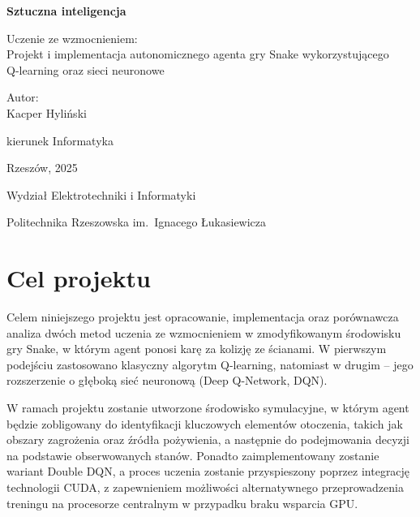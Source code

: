 \documentclass[a4paper,12pt]{article}
\begin{document}
\begin{titlepage}
  \thispagestyle{empty}
  \begin{center}
    {\LARGE\bfseries Sztuczna inteligencja\par}
    \vspace{1.5cm}

    {\large Uczenie ze wzmocnieniem:\\
    Projekt i implementacja autonomicznego agenta gry Snake wykorzystującego\\
    Q-learning oraz sieci neuronowe\par}
    \vspace{3cm}

    {\Large Autor:\\
    Kacper Hyliński\par}
    {\large kierunek Informatyka\par}
    \vfill

    {\large Rzeszów, 2025\par}
    \vspace{0.4cm}
    {\normalsize Wydział Elektrotechniki i Informatyki\par}
    {\normalsize Politechnika Rzeszowska im.\ Ignacego Łukasiewicza\par}
  \end{center}
\end{titlepage}
 
 \clearpage
  \thispagestyle{empty}
  \tableofcontents
  \clearpage

  \section{Cel projektu}
Celem niniejszego projektu jest opracowanie, implementacja oraz porównawcza analiza dwóch metod uczenia ze wzmocnieniem w zmodyfikowanym środowisku gry Snake, w którym agent ponosi karę za kolizję ze ścianami. W pierwszym podejściu zastosowano klasyczny algorytm Q-learning, natomiast w drugim – jego rozszerzenie o głęboką sieć neuronową (Deep Q-Network, DQN).

W ramach projektu zostanie utworzone środowisko symulacyjne, w którym agent będzie zobligowany do identyfikacji kluczowych elementów otoczenia, takich jak obszary zagrożenia oraz źródła pożywienia, a następnie do podejmowania decyzji na podstawie obserwowanych stanów. Ponadto zaimplementowany zostanie wariant Double DQN, a proces uczenia zostanie przyspieszony poprzez integrację technologii CUDA, z zapewnieniem możliwości alternatywnego przeprowadzenia treningu na procesorze centralnym w przypadku braku wsparcia GPU.
\end{document}
